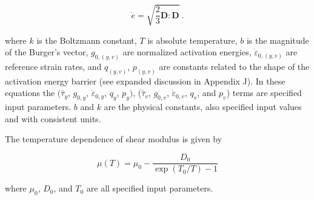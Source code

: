 \documentclass[11pt]{report}
\numberwithin{equation}{section}
\newcommand{\noi}{\noindent}
\begin{document}
\begin {equation}
\dot{e}=\sqrt{\frac{2}{3}\mathbf{D}:\mathbf{D}}\ .
\end{equation}

\noi where $k$ is the Boltzmann constant, $T$ is absolute temperature, $b$ is
the magnitude of the Burger's vector, $g_{0,(y,v)}$ are
normalized activation energies, $\dot{\varepsilon}_{0,(y,v)}$
are reference strain rates, and $q_{(y,v)}$, $p_{(y,v)}$
are constants related to the shape of the activation energy barrier (see expanded discussion in
Appendix J). In these equations the $(\hat{\tau}_y$, $g_{0,y}$, $\dot{\varepsilon}_{0,y}$,
$q_y$, $p_y)$, ($\hat{\tau}_v$, $g_{0,v}$, $\dot{\varepsilon}_{0,v}$,
$q_v$, and $p_v$) terms are specified input parameters.  $b$ and $k$ are the physical constants, also
specified input values and with consistent units.

The temperature dependence of shear modulus is given by

\begin{equation}
\mu\left(T\right)=\mu_{0}-\frac{D_{0}}{\exp\left({T_{0}}/{T}\right)-1}\label{eq:shear-modulus}
\end{equation}

\noindent where $\mu_{0}$, $D_{0}$, and $T_{0}$ are
all specified input parameters. 
\end{document}
